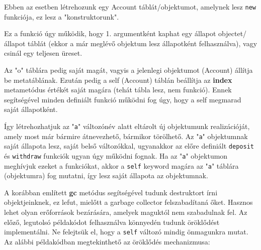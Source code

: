 Ebben az esetben létrehozunk egy Account táblát/objektumot, amelynek lesz \texttt{new} funkciója, ez lesz a "konstruktorunk".

Ez a funkció úgy működik, hogy 1. argumentként kaphat egy állapot objectet/állapot táblát (ekkor a már meglévő objektum lesz állapotként felhasználva), vagy csinál egy teljesen üreset.

Az "o" táblára pedig saját magát, vagyis a jelenlegi objektumot (Account) állítja be metatáblának. Ezután pedig a self (Account) táblán beállítja az \detokenize{__}\textbf{index} metametódus értékét saját magára (tehát tábla lesz, nem funkció). Ennek segítségével minden definiált funkció működni fog úgy, hogy a self megmarad saját állapotként.

Így létrehozhatjuk az "\texttt{a}" változónév alatt eltárolt új objektumunk realizációját, amely most már bármire átnevezhető, bármikor törölhető. Az "\texttt{a}" objektumnak saját állapota lesz, saját belső változókkal, ugyanakkor az előre definiált \texttt{deposit} és \texttt{withdraw} funkciók ugyan úgy működni fognak. Ha az "\texttt{a}" objektumon meghívjuk ezeket a funkciókat, akkor a \texttt{self} keyword magára az "\texttt{a}" táblára (objektumra) fog mutatni, így lesz saját állapota az objektumnak.

A korábban említett \detokenize{__}\textbf{gc} metódus segítségével tudunk destruktort írni objektjeinknek, ez lefut, mielőtt a garbage collector felszabadítaná őket. Hasznos lehet olyan erőforrások bezárására, amelyek maguktól nem szabadulnak fel.
\pagebreak
{}
Az előző, legutolsó példakódot felhasználva könnyedén tudunk öröklődést implementálni. Ne felejtsük el, hogy a \texttt{self} változó mindig önmagunkra mutat. Az alábbi példakódban megtekinthető az öröklődés mechanizmusa:

